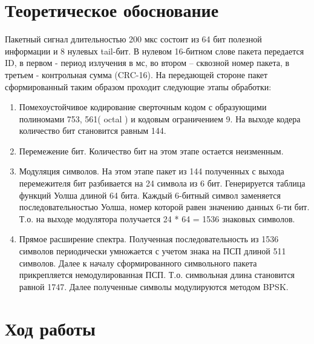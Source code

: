 \documentclass[a4paper,12pt]{article}
\begin{document}
\section{Теоретическое обоснование}

Пакетный сигнал длительностью 200 мкс состоит из 64 бит полезной информации и 8 нулевых tail-бит. В нулевом 16-битном слове пакета передается ID, в первом - период излучения в мс, во втором – сквозной номер пакета, в третьем - контрольная сумма (CRC-16). На передающей стороне пакет сформированный таким образом проходит следующие этапы обработки:

\begin{enumerate}

\item Помехоустойчивое кодирование сверточным кодом с образующими полиномами 753, 561( octal ) и кодовым ограничением 9. На выходе кодера количество бит становится равным 144.
\item Перемежение бит. Количество бит на этом этапе остается неизменным.
\item Модуляция символов. На этом этапе пакет из 144 полученных с выхода перемежителя бит разбивается на 24 символа из 6 бит. Генерируется таблица функций Уолша длиной 64 бита. Каждый 6-битный символ заменяется последовательностью Уолша, номер которой равен значению данных 6-ти бит. Т.о. на выходе модулятора получается 24 * 64 = 1536 знаковых символов.
\item Прямое расширение спектра. Полученная последовательность из 1536 символов периодически умножается с учетом знака на ПСП длиной 511 символов. Далее к началу сформированного символьного пакета прикрепляется немодулированная ПСП. Т.о. символьная длина становится равной 1747. Далее полученные символы модулируются методом BPSK.
\end{enumerate}
\newpage

\section{Ход работы}


\end{document}
